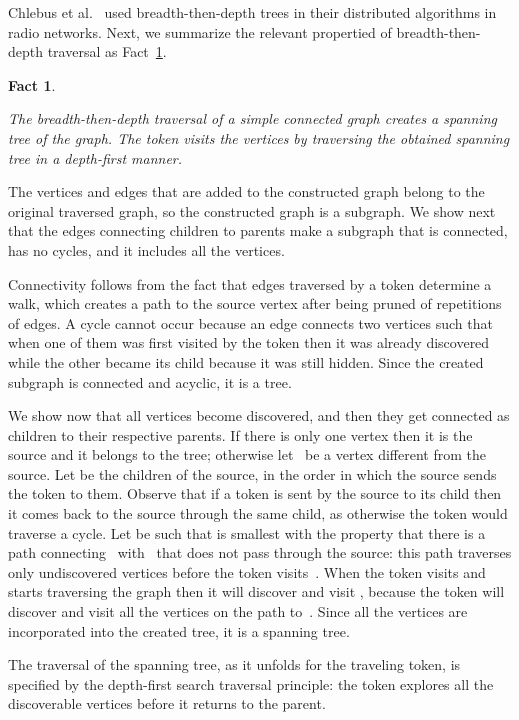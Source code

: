 \documentclass[11pt]{article}
\newcommand{\qed}{\hfill  \smallskip}
\newenvironment{proof}{\noindent{\bf Proof:}}{\qed}
\newtheorem{fact}{Fact}
\begin{document}
Chlebus et al.~\cite{ChlebusKPR-ICALP11} used breadth-then-depth trees in their distributed algorithms in radio networks.
Next, we summarize the relevant propertied of breadth-then-depth traversal as Fact~\ref{fact:breadth-then-depth}.  



\begin{fact}
\label{fact:breadth-then-depth}

The breadth-then-depth traversal of a simple connected graph creates a spanning tree of the graph.
The token visits the vertices by traversing the obtained spanning tree  in a depth-first manner.
\end{fact}

\begin{proof}
The vertices and edges that are added to the constructed graph belong to the original traversed  graph, so the constructed graph is a subgraph.
We show next that the edges connecting children to parents make a subgraph that is connected, has no cycles, and it includes all the vertices.

Connectivity follows from the fact that edges traversed by a token  determine a walk, which creates a path to the source vertex after being pruned of repetitions of edges.
A cycle cannot occur because an edge connects two vertices such that when one of them was first visited by the token then it was already discovered while the other became its child because it was still hidden.
Since the created subgraph is connected and acyclic, it is a tree.

We show now that all vertices become discovered, and then they get connected as children to their respective parents. 
If there is only one vertex then it is the source and it belongs to the tree; otherwise let~ be a vertex different from the source.
Let  be the children of the source, in the order in which the source sends the token to them. 
Observe that if a token is sent by the source to its child then it comes back to the source through the same child, as otherwise the token would traverse a cycle.
Let  be such that  is smallest with the property that there is a path connecting~ with~ that does not pass through the source: this path traverses only undiscovered vertices before the token visits~.
When the token visits  and starts traversing the graph then it will discover and visit ,  because the token will discover and visit all the vertices on the path to~.
Since all the vertices are incorporated into the created tree, it is a spanning tree.

The traversal of the spanning tree, as it unfolds for the traveling token, is specified by the depth-first search traversal principle: the token explores all the discoverable vertices before it returns to the parent.
\end{proof}
\end{document}
